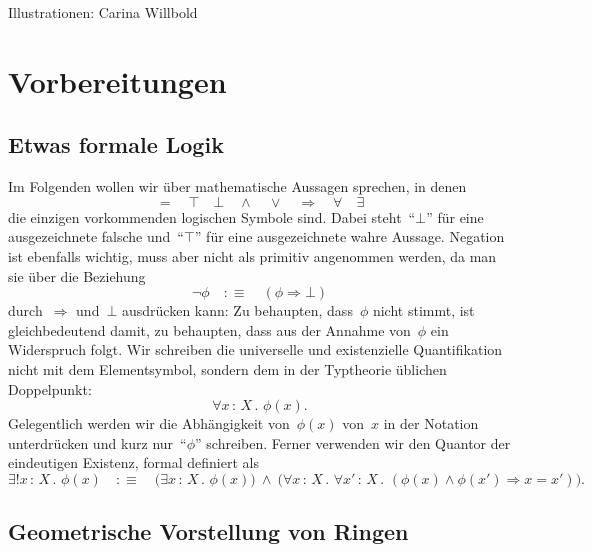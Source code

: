 \documentclass[a4paper,ngerman,12pt]{scrartcl}
\theoremstyle{definition}
\theoremstyle{plain}
\theoremstyle{remark}
\renewcommand{\_}{\mathpunct{.}\,}
\newcommand{\?}{\,{:}\,}
\begin{document}
Illustrationen: Carina Willbold

\tableofcontents

\newpage

\section{Vorbereitungen}

\subsection{Etwas formale Logik}

Im Folgenden wollen wir über mathematische Aussagen sprechen, in denen
\[ {=} \quad {\top} \quad {\bot} \quad {\wedge} \quad {\vee} \quad {\Rightarrow} \quad {\forall} \quad {\exists} \]
die einzigen vorkommenden logischen Symbole sind. Dabei steht~"`$\bot$"' für
eine ausgezeichnete falsche und~"`$\top$"' für eine ausgezeichnete wahre Aussage.
Negation ist ebenfalls wichtig, muss aber nicht als primitiv
angenommen werden, da man sie über die Beziehung
\[ \neg\phi \quad:\equiv\quad (\phi \Rightarrow \bot) \]
durch~$\Rightarrow$ und~$\bot$ ausdrücken kann: Zu behaupten, dass~$\phi$ nicht
stimmt, ist gleichbedeutend damit, zu behaupten, dass aus der Annahme
von~$\phi$ ein Widerspruch folgt.
Wir schreiben die universelle und existenzielle Quantifikation nicht mit dem
Elementsymbol, sondern dem in der Typtheorie üblichen Doppelpunkt:
\[ \forall x\?X\_ \phi(x). \]
Gelegentlich werden wir die Abhängigkeit von~$\phi(x)$ von~$x$ in der Notation
unterdrücken und kurz nur~"`$\phi$"' schreiben. Ferner verwenden wir den
Quantor der eindeutigen Existenz, formal definiert als
\[ \exists! x\?X\_ \phi(x) \quad:\equiv\quad
  \bigl(\exists x\?X\_ \phi(x)\bigr) \ \wedge\ \bigl(\forall x\?X\_ \forall x'\?X\_
  (\phi(x) \wedge \phi(x') \Rightarrow x = x')\bigr). \]


\subsection{Geometrische Vorstellung von Ringen}
\end{document}
